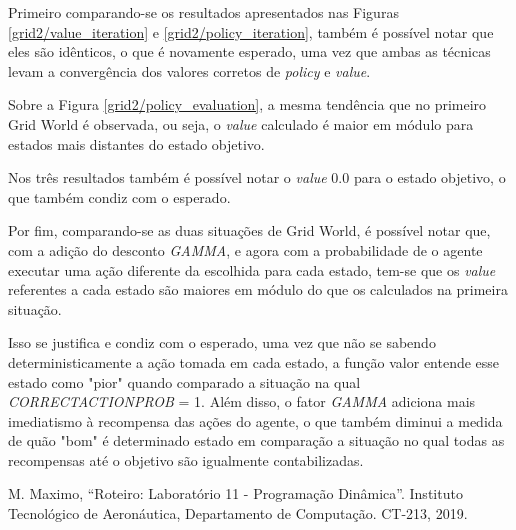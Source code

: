 \documentclass[conference]{IEEEtran}
\begin{document}
Primeiro comparando-se os resultados apresentados nas Figuras \ref{grid2/value_iteration} e \ref{grid2/policy_iteration}, também é possível notar que eles são idênticos, o que é novamente esperado, uma vez que ambas as técnicas levam a convergência dos valores corretos de \textit{policy} e \textit{value}.

Sobre a Figura \ref{grid2/policy_evaluation}, a mesma tendência que no primeiro Grid World é observada, ou seja, o \textit{value} calculado é maior em módulo para estados mais distantes do estado objetivo.

Nos três resultados também é possível notar o \textit{value} 0.0 para o estado objetivo, o que também condiz com o esperado. 

Por fim, comparando-se as duas situações de Grid World, é possível notar que, com a adição do desconto \textit{GAMMA}, e agora com a probabilidade de o agente executar uma ação diferente da escolhida para cada estado, tem-se que os \textit{value} referentes a cada estado são maiores em módulo do que os calculados na primeira situação.

Isso se justifica e condiz com o esperado, uma vez que não se sabendo deterministicamente a ação tomada em cada estado, a função valor entende esse estado como "pior" quando comparado a situação na qual \textit{CORRECT\underline{\space}ACTION\underline{\space}PROB} = 1. Além disso, o fator \textit{GAMMA} adiciona mais imediatismo à recompensa das ações do agente, o que também diminui a medida de quão "bom" é determinado estado em comparação a situação no qual todas as recompensas até o objetivo são igualmente contabilizadas.

\begin{thebibliography}{00}
 M. Maximo, ``Roteiro: Laboratório 11 - Programação Dinâmica''. Instituto Tecnológico de Aeronáutica, Departamento de Computação. CT-213, 2019.
\end{thebibliography}
\end{document}
